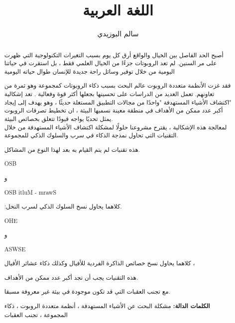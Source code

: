 \documentclass[11pt,a4paper]{report}
\title{
	\Huge\textsc{اللغة العربية}
}
\author{سالم البوزيدي}
\begin{document}
\begin{otherlanguage}{arabic}

	\begin{abstract}
	\begin{otherlanguage}{arabic}
	
			
	
	أصبح الحد الفاصل بين الخيال والواقع أرق كل يوم بسبب التغيرات التكنولوجية التي ظهرت على مر السنين.  
		لم تعد الروبوتات جزءًا من الخيال العلمي فقط ،  
		بل استقرت في حياتنا اليومية من خلال توفير وسائل راحة جديدة للإنسان طوال حياته اليومية 
		
		
		 فقد  غزت الأنظمة متعددة الروبوت عالم البحث بسبب ذكاء الروبوتات كمجموعة وهو ثمرة من تعاونهم. 
		 تعمل العديد من الدراسات على تحسينها بجعلها أكثر قوة وفعالية .
	 تعد إشكالية "اكتشاف الأشياء المستهدفة "واحدًا من مجالات التطبيق المستغلة حديثًا ، وهو يهدف إلى إيجاد أكبر عدد ممكن من الأهداف في منطقة معينة نسميها البيئة ،  ان تخطيط تصرفات الروبوت يمثل تحديًا يواجه قيودًا تتعلق بخصائص البيئة. \\
 لمعالجة هذه الإشكالية ، يقترح مشروعنا حلولًا لمشكلة اكتشاف الأشياء المستهدفة من خلال  التقنيات التي تحاول نمذجة الذكاء في سرب والسلوك الذكي للمجموعة.
\end{otherlanguage}
 \begin{otherlanguage}{arabic}
  هذه
 تقنيات لم يتم القيام به بعد لهذا النوع من المشاكل.
\end{otherlanguage}
\begin{otherlanguage}{english}
	 OSB \begin{otherlanguage}{arabic} و\end{otherlanguage} OSB itluM - mrawS 
\end{otherlanguage}
\begin{otherlanguage}{arabic}:كلاهما يحاول نسخ السلوك الذكي لسرب النحل.\\\end{otherlanguage}
\begin{otherlanguage}{english}
OHE \begin{otherlanguage}{arabic} و\end{otherlanguage}ASWSE 
\end{otherlanguage}
\begin{otherlanguage}{arabic}
 كلاهما يحاول نسخ خصائص الذاكرة الفردية للأفيال وكذلك ذكاء عشائر الأفيال ،


هذه التقنيات يجب أن تجد أكبر عدد ممكن من الأهداف.

مع تجنب العقبات التي قد تكون موجودة في بيئة غير معروفة مسبقا.

\textbf{الكلمات  الدالة:}
مشكلة البحث عن الأشياء المستهدفة ، أنظمة متعددة الروبوت ، ذكاء المجموعة ، تجنب العقبات
	\end{otherlanguage}
	\end{abstract}
\end{otherlanguage}
\end{document}
